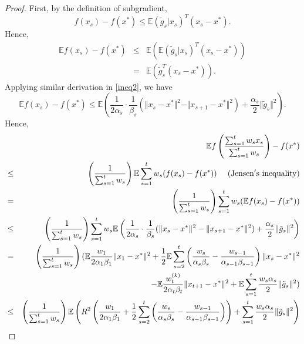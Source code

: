 \documentclass[sn-mathphys]{JORSC-jnl}%
\theoremstyle{thmstyleone}%
\theoremstyle{thmstylethree}%
\begin{document}
\begin{proof}
	First, by the definition of subgradient,
	\begin{equation*}
		f(x_s)-f(x^*) \leq \mathbb{E}(\tilde{g}_s \vert x_s)^T(x_s-x^*).
	\end{equation*}
	Hence, 
	\begin{eqnarray}
		\mathbb{E}f(x_s)-f(x^*) &\leq& \mathbb{E}\left(\mathbb{E}(\tilde{g}_s \vert x_s)^T(x_s-x^*)\right) \nonumber \\
		&=& \mathbb{E}\left(\tilde{g}_s^T(x_s-x^*)\right).\nonumber
	\end{eqnarray}
	Applying similar derivation in \eqref{ineq2}, we have
	\begin{equation*}
		\mathbb{E}f(x_s)-f(x^*) \leq \mathbb{E}\left(\frac{1}{2\alpha_s}\cdot\frac{1}{\beta_s}(\Vert x_s-x^* \Vert^2-\Vert x_{s+1}-x^* \Vert^2)+\frac{\alpha_s}{2}\Vert \tilde{g}_s \Vert^2\right).
	\end{equation*}
	Hence,
	\begin{eqnarray}
		&&\mathbb{E}f\left( \frac{\sum_{s=1}^t w_s x_s}{\sum_{s=1}^t w_s} \right) - f(x^*) \nonumber \\
		&\leq& \left(\frac{1}{\sum_{s=1}^t w_s}\right)\mathbb{E}\sum_{s=1}^t w_s(f(x_s)-f(x^*)) ~~~~({\rm Jensen's~ inequality})\nonumber \\
		&=& \left(\frac{1}{\sum_{s=1}^t w_s}\right)\sum_{s=1}^t w_s(\mathbb{E}f(x_s)-f(x^*))\nonumber \\
		&\leq&  \left(\frac{1}{\sum_{s=1}^t w_s}\right)\sum_{s=1}^t w_s\mathbb{E}\left(\frac{1}{2\alpha_s}\cdot\frac{1}{\beta_s}(\Vert x_s-x^* \Vert^2-\Vert x_{s+1}-x^* \Vert^2)+\frac{\alpha_s}{2}\Vert \tilde{g}_s \Vert^2\right) \nonumber \\
		&=& \left(\frac{1}{\sum_{s=1}^t w_s}\right)(\mathbb{E}\frac{w_1}{2\alpha_1\beta_1}\Vert x_1-x^* \Vert^2+\frac{1}{2}\mathbb{E}\sum_{s=2}^t\left(\frac{w_s}{ \alpha_s\beta_s }-\frac{w_{s-1}}{ \alpha_{s-1}\beta_{s-1}}\right)\Vert x_s-x^* \Vert^2\nonumber\\
		&& -\mathbb{E}\frac{w_t^{(k)}}{ 2\alpha_{t}\beta_t }\Vert x_{t+1}-x^* \Vert^2+\mathbb{E}\sum_{s=1}^t\frac{w_s\alpha_s}{2}\Vert \tilde{g}_s \Vert^2)\nonumber\\
		&\leq& \left(\frac{1}{\sum_{s=1}^t w_s}\right)\mathbb{E}\left(R^2 \left( \frac{w_1}{2\alpha_1\beta_1}+\frac{1}{2}\sum_{s=2}^t\left(\frac{w_s}{ \alpha_s\beta_s }-\frac{w_{s-1}}{ \alpha_{s-1}\beta_{s-1}}\right) \right)+\sum_{s=1}^t\frac{w_s\alpha_s}{2}\Vert \tilde{g}_s \Vert^2\right) \nonumber\\

\end{eqnarray}
\end{proof}
\end{document}
